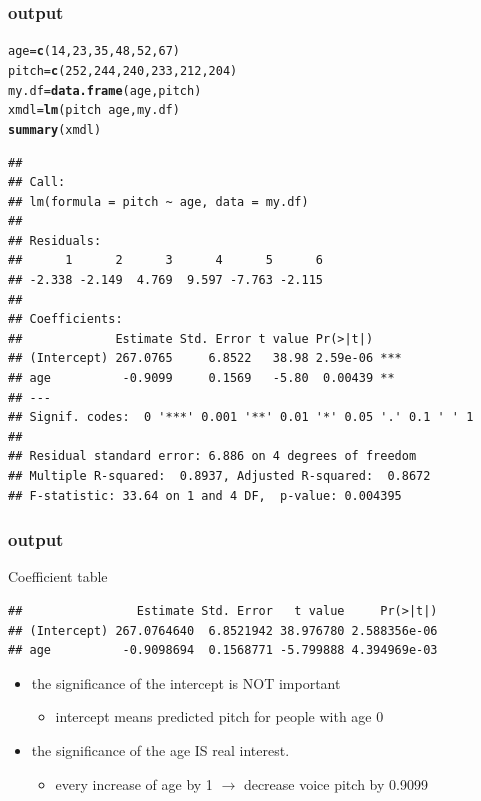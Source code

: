 \documentclass{beamer}\usepackage[]{graphicx}\usepackage[]{color}
\makeatletter
\newcommand{\hlnum}[1]{\textcolor[rgb]{0.686,0.059,0.569}{#1}}%
\newcommand{\hlopt}[1]{\textcolor[rgb]{0,0,0}{#1}}%
\newcommand{\hlstd}[1]{\textcolor[rgb]{0.345,0.345,0.345}{#1}}%
\newcommand{\hlkwb}[1]{\textcolor[rgb]{0.69,0.353,0.396}{#1}}%
\newcommand{\hlkwd}[1]{\textcolor[rgb]{0.737,0.353,0.396}{\textbf{#1}}}%
\newenvironment{kframe}{%
 \def\at@end@of@kframe{}%
 \ifinner\ifhmode%
  \def\at@end@of@kframe{\end{minipage}}%
  \begin{minipage}{\columnwidth}%
 \fi\fi%
 \def\FrameCommand##1{\hskip\@totalleftmargin \hskip-\fboxsep
 \colorbox{shadecolor}{##1}\hskip-\fboxsep
     \hskip-\linewidth \hskip-\@totalleftmargin \hskip\columnwidth}%
 \MakeFramed {\advance\hsize-\width
   \@totalleftmargin\z@ \linewidth\hsize
   \@setminipage}}%
 {\par\unskip\endMakeFramed%
 \at@end@of@kframe}
\newenvironment{knitrout}{}{} %
\makeatother
\begin{document}
\begin{frame}[fragile]
\frametitle{output}
\begin{knitrout}\tiny
{}\color{fgcolor}\begin{kframe}
\begin{alltt}
\hlstd{age} \hlkwb{=} \hlkwd{c}\hlstd{(}\hlnum{14}\hlstd{,}\hlnum{23}\hlstd{,}\hlnum{35}\hlstd{,}\hlnum{48}\hlstd{,}\hlnum{52}\hlstd{,}\hlnum{67}\hlstd{)}
\hlstd{pitch} \hlkwb{=} \hlkwd{c}\hlstd{(}\hlnum{252}\hlstd{,}\hlnum{244}\hlstd{,}\hlnum{240}\hlstd{,}\hlnum{233}\hlstd{,}\hlnum{212}\hlstd{,}\hlnum{204}\hlstd{)}
\hlstd{my.df} \hlkwb{=} \hlkwd{data.frame}\hlstd{(age, pitch)}
\hlstd{xmdl} \hlkwb{=} \hlkwd{lm}\hlstd{(pitch}\hlopt{~}\hlstd{age, my.df)}
\hlkwd{summary}\hlstd{(xmdl)}
\end{alltt}
\begin{verbatim}
## 
## Call:
## lm(formula = pitch ~ age, data = my.df)
## 
## Residuals:
##      1      2      3      4      5      6 
## -2.338 -2.149  4.769  9.597 -7.763 -2.115 
## 
## Coefficients:
##             Estimate Std. Error t value Pr(>|t|)    
## (Intercept) 267.0765     6.8522   38.98 2.59e-06 ***
## age          -0.9099     0.1569   -5.80  0.00439 ** 
## ---
## Signif. codes:  0 '***' 0.001 '**' 0.01 '*' 0.05 '.' 0.1 ' ' 1
## 
## Residual standard error: 6.886 on 4 degrees of freedom
## Multiple R-squared:  0.8937,	Adjusted R-squared:  0.8672 
## F-statistic: 33.64 on 1 and 4 DF,  p-value: 0.004395
\end{verbatim}
\end{kframe}
\end{knitrout}
\end{frame}

\begin{frame}[fragile]
\frametitle{output}
Coefficient table
\begin{knitrout}\scriptsize
{}\color{fgcolor}\begin{kframe}
\begin{verbatim}
##                Estimate Std. Error   t value     Pr(>|t|)
## (Intercept) 267.0764640  6.8521942 38.976780 2.588356e-06
## age          -0.9098694  0.1568771 -5.799888 4.394969e-03
\end{verbatim}
\end{kframe}
\end{knitrout}
\begin{itemize}
\item the significance of the intercept is NOT important
	\begin{itemize}
	\item intercept means predicted pitch for people with age 0
	\end{itemize}
\item the significance of the age IS real interest.
	\begin{itemize}
	\item every increase of age by 1 $\rightarrow$ decrease voice pitch by 0.9099
	\end{itemize}

\end{itemize}
\end{frame}
\end{document}

